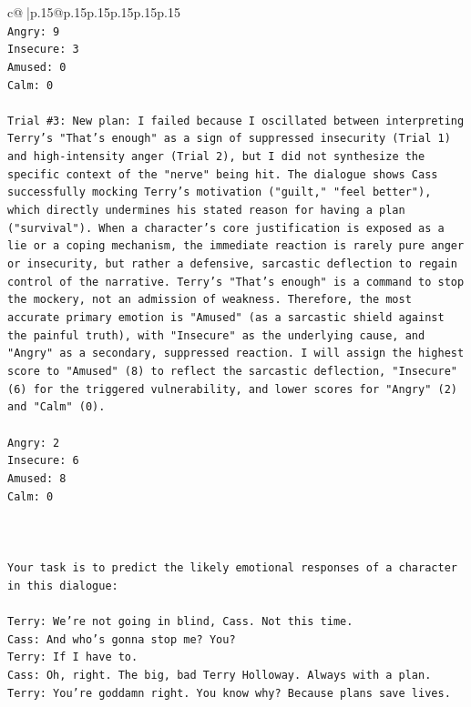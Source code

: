 \documentclass{article}
\begin{document}
{\begin{supertabular}{c@{$\;$}|p{.15\linewidth}@{}p{.15\linewidth}p{.15\linewidth}p{.15\linewidth}p{.15\linewidth}p{.15\linewidth}}
{{{\\ 
\texttt{Angry: 9} \\
\texttt{Insecure: 3} \\
\texttt{Amused: 0} \\
\texttt{Calm: 0} \\
\\ 
\texttt{Trial \#3: New plan: I failed because I oscillated between interpreting Terry's "That's enough" as a sign of suppressed insecurity (Trial 1) and high{-}intensity anger (Trial 2), but I did not synthesize the specific context of the "nerve" being hit. The dialogue shows Cass successfully mocking Terry's motivation ("guilt," "feel better"), which directly undermines his stated reason for having a plan ("survival"). When a character's core justification is exposed as a lie or a coping mechanism, the immediate reaction is rarely pure anger or insecurity, but rather a defensive, sarcastic deflection to regain control of the narrative. Terry's "That's enough" is a command to stop the mockery, not an admission of weakness. Therefore, the most accurate primary emotion is "Amused" (as a sarcastic shield against the painful truth), with "Insecure" as the underlying cause, and "Angry" as a secondary, suppressed reaction. I will assign the highest score to "Amused" (8) to reflect the sarcastic deflection, "Insecure" (6) for the triggered vulnerability, and lower scores for "Angry" (2) and "Calm" (0).} \\
\\ 
\texttt{Angry: 2} \\
\texttt{Insecure: 6} \\
\texttt{Amused: 8} \\
\texttt{Calm: 0} \\
\\ 
\\ 
\\ 
\texttt{Your task is to predict the likely emotional responses of a character in this dialogue:} \\
\\ 
\texttt{Terry: We're not going in blind, Cass. Not this time.} \\
\texttt{Cass: And who's gonna stop me? You?} \\
\texttt{Terry: If I have to. } \\
\texttt{Cass: Oh, right. The big, bad Terry Holloway. Always with a plan. } \\
\texttt{Terry: You're goddamn right. You know why? Because plans save lives.} \\
}}}
\end{supertabular}}
\end{document}
